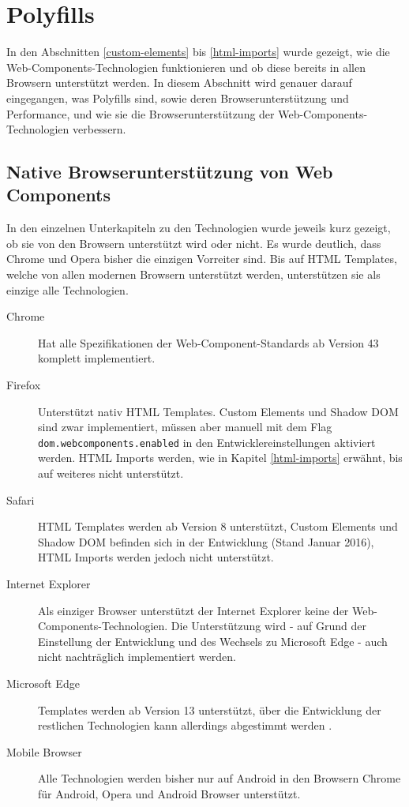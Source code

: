 \section{Polyfills}\label{polyfills-mit-webcomponents.js}

In den Abschnitten \ref{custom-elements} bis \ref{html-imports} wurde gezeigt, wie die Web-Components-Technologien funktionieren und ob diese bereits in allen Browsern unterstützt werden. In diesem Abschnitt wird genauer darauf eingegangen, was Polyfills sind, sowie deren Browserunterstützung und Performance, und wie sie die Browserunterstützung der Web-Components-Technologien verbessern.


\subsection{Native Browserunterstützung von Web Components}\label{native-browserunterstuxfctzung-von-web-components}

In den einzelnen Unterkapiteln zu den Technologien wurde jeweils kurz gezeigt, ob sie von den Browsern unterstützt wird oder nicht. Es wurde deutlich, dass Chrome und Opera bisher die einzigen Vorreiter sind. Bis auf \ac{HTML} Templates, welche von allen modernen Browsern unterstützt werden, unterstützen sie als einzige alle Technologien. \cite{citeulike:13914379}

\begin{description}
  \item[Chrome] Hat alle Spezifikationen der Web-Component-Standards ab Version 43 komplett implementiert.
  \item[Firefox] Unterstützt nativ \ac{HTML} Templates. Custom Elements und Shadow \ac{DOM} sind zwar implementiert, müssen aber manuell mit dem Flag \texttt{dom.webcomponents.enabled} in den Entwicklereinstellungen aktiviert werden. \ac{HTML} Imports werden, wie in Kapitel \ref{html-imports} erwähnt, bis auf weiteres nicht unterstützt.
  \item[Safari] \ac{HTML} Templates werden ab Version 8 unterstützt, Custom Elements und Shadow \ac{DOM} befinden sich in der Entwicklung (Stand Januar 2016), \ac{HTML} Imports werden jedoch nicht unterstützt.
  \item[Internet Explorer] Als einziger Browser unterstützt der Internet Explorer keine der Web-Components-Technologien. Die Unterstützung wird - auf Grund der Einstellung der Entwicklung und des Wechsels zu Microsoft Edge - auch nicht nachträglich implementiert werden.
  \item[Microsoft Edge] Templates werden ab Version 13 unterstützt, über die Entwicklung der restlichen Technologien kann allerdings abgestimmt werden \cite{citeulike:13914237}.
  \item[Mobile Browser] Alle Technologien werden bisher nur auf Android in den Browsern Chrome für Android, Opera und Android Browser unterstützt.
\end{description}

